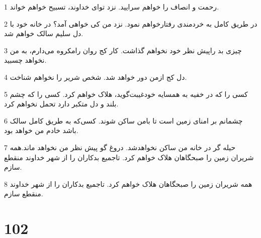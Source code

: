 \par 1 رحمت و انصاف را خواهم سرایید. نزد تو‌ای خداوند، تسبیح خواهم خواند.
\par 2 در طریق کامل به خردمندی رفتارخواهم نمود. نزد من کی خواهی آمد؟ در خانه خود با دل سلیم سالک خواهم شد.
\par 3 چیزی بد راپیش نظر خود نخواهم گذاشت. کار کج روان رامکروه می‌دارم، به من نخواهد چسبید.
\par 4 دل کج ازمن دور خواهد شد. شخص شریر را نخواهم شناخت.
\par 5 کسی را که در خفیه به همسایه خودغیبت‌گوید، هلاک خواهم کرد. کسی را که چشم بلند و دل متکبر دارد تحمل نخواهم کرد.
\par 6 چشمانم بر امنای زمین است تا بامن ساکن شوند. کسی‌که به طریق کامل سالک باشد خادم من خواهد بود.
\par 7 حیله گر در خانه من ساکن نخواهدشد. دروغ گو پیش نظر من نخواهد ماند.همه شریران زمین را صبحگاهان هلاک خواهم کرد. تاجمیع بدکاران را از شهر خداوند منقطع سازم.
\par 8 همه شریران زمین را صبحگاهان هلاک خواهم کرد. تاجمیع بدکاران را از شهر خداوند منقطع سازم.
 
\chapter{102}

